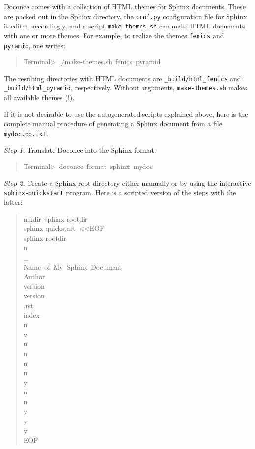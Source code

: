 \documentclass[a4paper]{article}
\begin{document}
Doconce comes with a collection of HTML themes for Sphinx documents.
These are packed out in the Sphinx directory, the \texttt{conf.py}
configuration file for Sphinx is edited accordingly, and a script
\texttt{make-themes.sh} can make HTML documents with one or more themes.
For example,
to realize the themes \texttt{fenics} and \texttt{pyramid}, one writes:
%
\begin{quote}{\ttfamily \raggedright \noindent
Terminal>~./make-themes.sh~fenics~pyramid
}
\end{quote}

The resulting directories with HTML documents are \texttt{\_build/html\_fenics}
and \texttt{\_build/html\_pyramid}, respectively. Without arguments,
\texttt{make-themes.sh} makes all available themes (!).

If it is not desirable to use the autogenerated scripts explained
above, here is the complete manual procedure of generating a
Sphinx document from a file \texttt{mydoc.do.txt}.

\emph{Step 1.} Translate Doconce into the Sphinx format:
%
\begin{quote}{\ttfamily \raggedright \noindent
Terminal>~doconce~format~sphinx~mydoc
}
\end{quote}

\emph{Step 2.} Create a Sphinx root directory
either manually or by using the interactive \texttt{sphinx-quickstart}
program. Here is a scripted version of the steps with the latter:
%
\begin{quote}{\ttfamily \raggedright \noindent
mkdir~sphinx-rootdir\\
sphinx-quickstart~<{}<EOF\\
sphinx-rootdir\\
n\\
\_\\
Name~of~My~Sphinx~Document\\
Author\\
version\\
version\\
.rst\\
index\\
n\\
y\\
n\\
n\\
n\\
n\\
y\\
n\\
n\\
y\\
y\\
y\\
EOF
}
\end{quote}
\end{document}
